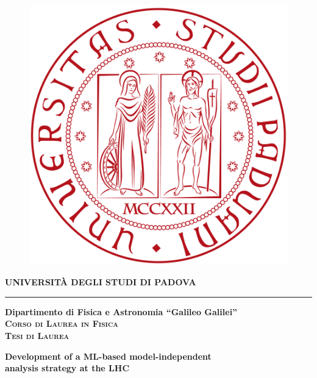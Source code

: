 \thispagestyle{empty}
\frontmatter
\begin{titlepage}
\vspace{5mm}
\begin{figure}[hbtp]
\centering
\includegraphics[scale=.13]{Images/UNIPD.png}
\end{figure}
\vspace{5mm}
\begin{center}
{{\huge{\textsc{\bf UNIVERSIT\`A DEGLI STUDI DI PADOVA}}}\\}
\vspace{5mm}
\hrule
\vspace{5mm}
{\Large{\bf Dipartimento di Fisica e Astronomia ``Galileo Galilei''}} \\
\vspace{5mm}
{\Large{\textsc{\bf Corso di Laurea in Fisica}}}\\
\vspace{20mm}
{\Large{\textsc{\bf Tesi di Laurea}}}\\
\vspace{20mm}
\begin{spacing}{2}
{\LARGE \textbf{Development of a ML-based model-independent \\analysis strategy at the LHC}}\\
\end{spacing}
\vspace{8mm}
\end{center}


\end{titlepage}
